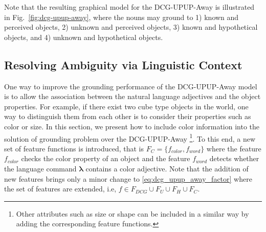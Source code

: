 Note that the resulting graphical model for the DCG-UPUP-Away is illustrated in Fig.~\ref{fig:dcg-upup-away}, where the nouns may ground to 1) known and perceived objects, 2) unknown and perceived objects, 3) known and hypothetical objects, and 4) unknown and hypothetical objects. 
\subsection{Resolving Ambiguity via Linguistic Context}
\label{sec:color}
One way to improve the grounding performance of the DCG-UPUP-Away model is to allow the association between the natural language adjectives and the object properties. For example, if there exist two cube type objects in the world, one way to distinguish them from each other is to consider their properties such as color or size. In this section, we present how to include color information into the solution of grounding problem over the DCG-UPUP-Away \footnote{Other attributes such as size or shape can be included in a similar way by adding the corresponding feature functions.}. To this end, a new set of feature functions is introduced, that is $F_C = \{f_{color}, f_{word}\}$ where the feature $f_{color}$ checks the color property of an object and the feature $f_{word}$ detects whether the language command $\boldsymbol\lambda$ contains a color adjective. Note that the addition of new features brings only a minor change to \eqref{eq:dcg_upup_away_factor} where the set of features are extended, i.e, $f \in F_{DCG} \cup F_U \cup F_H \cup F_C$. 

